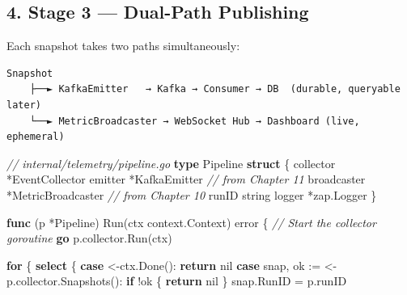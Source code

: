 \documentclass[
]{article}
\newenvironment{Shaded}{}{}
\newcommand{\CommentTok}[1]{\textcolor[rgb]{0.38,0.63,0.69}{\textit{#1}}}
\newcommand{\ControlFlowTok}[1]{\textcolor[rgb]{0.00,0.44,0.13}{\textbf{#1}}}
\newcommand{\DataTypeTok}[1]{\textcolor[rgb]{0.56,0.13,0.00}{#1}}
\newcommand{\KeywordTok}[1]{\textcolor[rgb]{0.00,0.44,0.13}{\textbf{#1}}}
\newcommand{\NormalTok}[1]{#1}
\newcommand{\OperatorTok}[1]{\textcolor[rgb]{0.40,0.40,0.40}{#1}}
\newcommand{\OtherTok}[1]{\textcolor[rgb]{0.00,0.44,0.13}{#1}}
\begin{document}
\hypertarget{stage-3-dual-path-publishing}{%
\subsection{4. Stage 3 --- Dual-Path
Publishing}\label{stage-3-dual-path-publishing}}

Each snapshot takes two paths simultaneously:

\begin{verbatim}
Snapshot
    ├──► KafkaEmitter   → Kafka → Consumer → DB  (durable, queryable later)
    └──► MetricBroadcaster → WebSocket Hub → Dashboard (live, ephemeral)
\end{verbatim}

\begin{Shaded}
\begin{Highlighting}[]
\CommentTok{// internal/telemetry/pipeline.go}
\KeywordTok{type}\NormalTok{ Pipeline }\KeywordTok{struct} \OperatorTok{\{}
\NormalTok{    collector   }\OperatorTok{*}\NormalTok{EventCollector}
\NormalTok{    emitter     }\OperatorTok{*}\NormalTok{KafkaEmitter       }\CommentTok{// from Chapter 11}
\NormalTok{    broadcaster }\OperatorTok{*}\NormalTok{MetricBroadcaster  }\CommentTok{// from Chapter 10}
\NormalTok{    runID       }\DataTypeTok{string}
\NormalTok{    logger      }\OperatorTok{*}\NormalTok{zap}\OperatorTok{.}\NormalTok{Logger}
\OperatorTok{\}}

\KeywordTok{func} \OperatorTok{(}\NormalTok{p }\OperatorTok{*}\NormalTok{Pipeline}\OperatorTok{)}\NormalTok{ Run}\OperatorTok{(}\NormalTok{ctx context}\OperatorTok{.}\NormalTok{Context}\OperatorTok{)} \DataTypeTok{error} \OperatorTok{\{}
    \CommentTok{// Start the collector goroutine}
    \ControlFlowTok{go}\NormalTok{ p}\OperatorTok{.}\NormalTok{collector}\OperatorTok{.}\NormalTok{Run}\OperatorTok{(}\NormalTok{ctx}\OperatorTok{)}

    \ControlFlowTok{for} \OperatorTok{\{}
        \ControlFlowTok{select} \OperatorTok{\{}
        \ControlFlowTok{case} \OperatorTok{\textless{}{-}}\NormalTok{ctx}\OperatorTok{.}\NormalTok{Done}\OperatorTok{():}
            \ControlFlowTok{return} \OtherTok{nil}
        \ControlFlowTok{case}\NormalTok{ snap}\OperatorTok{,}\NormalTok{ ok }\OperatorTok{:=} \OperatorTok{\textless{}{-}}\NormalTok{p}\OperatorTok{.}\NormalTok{collector}\OperatorTok{.}\NormalTok{Snapshots}\OperatorTok{():}
            \ControlFlowTok{if} \OperatorTok{!}\NormalTok{ok }\OperatorTok{\{}
                \ControlFlowTok{return} \OtherTok{nil}
            \OperatorTok{\}}
\NormalTok{            snap}\OperatorTok{.}\NormalTok{RunID }\OperatorTok{=}\NormalTok{ p}\OperatorTok{.}\NormalTok{runID}


\end{Highlighting}
\end{Shaded}
\end{document}
